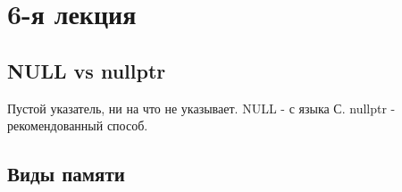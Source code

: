 \section{6-я лекция}

\subsection{NULL vs nullptr}
Пустой указатель, ни на что не указывает. NULL - с языка С. nullptr - рекомендованный способ.


\subsection{Виды памяти}
